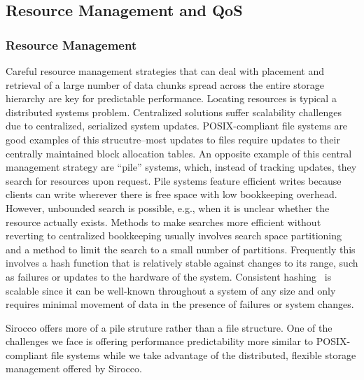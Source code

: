 \subsection{Resource Management and QoS}
\label{sec:qos}

\subsubsection{Resource Management}
Careful resource management strategies that can deal with placement and
retrieval of a large number of data chunks spread across the entire storage
hierarchy are key for predictable performance. 
Locating resources is typical a distributed systems problem. Centralized
solutions suffer scalability challenges due to centralized, serialized system
updates.  POSIX-compliant file systems are good examples of this
strucutre--most updates to files require updates to their centrally maintained
block allocation tables.
An opposite example of this central management strategy are ``pile'' systems,
which, instead of tracking updates, they search for resources upon request.
Pile systems feature efficient writes because clients can write wherever there
is free space with low bookkeeping overhead.  However, unbounded search is
possible, e.g., when it is unclear whether the resource actually exists.
Methods to make searches more efficient without reverting to centralized
bookkeeping usually involves search space partitioning and a method to limit
the search to a small number of partitions.  Frequently this involves a
hash function that is relatively stable against changes to its range, such as
failures or updates to the hardware of the system. Consistent
hashing~\cite{karger:stoc97} is scalable since it can be well-known throughout
a system of any size and only requires minimal movement of data in the presence
of failures or system changes. 

Sirocco offers more of a pile struture rather than a file structure. One of the
challenges we face is offering performance predictability more similar to
POSIX-compliant file systems while we take advantage of the distributed,
flexible storage management offered by Sirocco.

